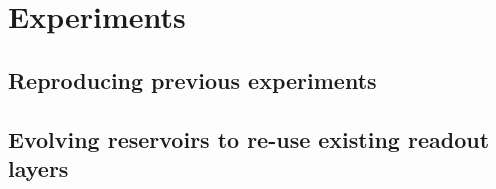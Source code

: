 \section{Experiments}

\subsection{Reproducing previous experiments}

\subsection{Evolving reservoirs to re-use existing readout layers}
